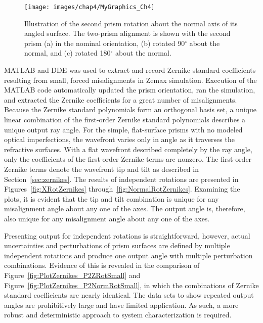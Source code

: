 \begin{figure}[htb]	%
\centering
\texttt{[image: images/chap4/MyGraphics\_Ch4]}
\caption{\textmd{Illustration of the second prism rotation about the normal axis of its angled surface. The two-prism alignment is shown with the second prism (a) in the nominal orientation, (b) rotated 90$^\circ$ about the normal, and (c) rotated 180$^\circ$ about the normal.}}
\label{fig:NormalRotation}
\end{figure}

MATLAB and \ac{DDE} was used to extract and record Zernike standard coefficients resulting from small, forced misalignments in Zemax simulation. Execution of the MATLAB code automatically updated the prism orientation, ran the simulation, and extracted the Zernike coefficients for a great number of misalignments. Because the Zernike standard polynomials form an orthogonal basis set, a unique linear combination of the first-order Zernike standard polynomials describes a unique output ray angle. For the simple, flat-surface prisms with no modeled optical imperfections, the wavefront varies only in angle as it traverses the refractive surfaces. With a flat wavefront described completely by the ray angle, only the coefficients of the first-order Zernike terms are nonzero. The first-order Zernike terms denote the wavefront tip and tilt as described in Section~\ref{sec:zernikes}. The results of independent rotations are presented in Figures~\ref{fig:XRotZernikes} through~\ref{fig:NormalRotZernikes}. Examining the plots, it is evident that the tip and tilt combination is unique for any misalignment angle about any one of the axes. The output angle is, therefore, also unique for any misalignment angle about any one of the axes.

Presenting output for independent rotations is straightforward, however, actual uncertainties and perturbations of prism surfaces are defined by multiple independent rotations and produce one output angle with multiple perturbation combinations. Evidence of this is revealed in the comparison of Figure~\ref{fig:PlotZernikes_P2ZRotSmall} and Figure~\ref{fig:PlotZernikes_P2NormRotSmall}, in which the combinations of Zernike standard coefficients are nearly identical. The data sets to show repeated output angles are prohibitively large and have limited application. As such, a more robust and deterministic approach to system characterization is required.

